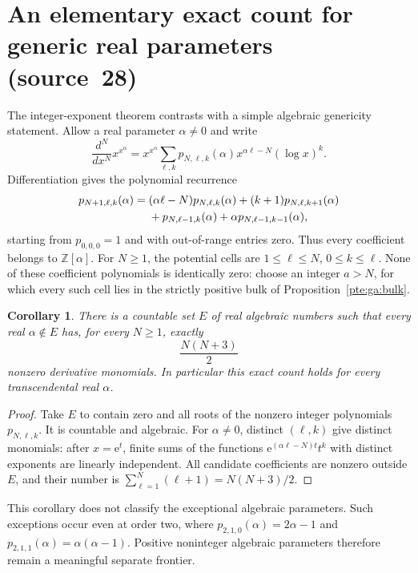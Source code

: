 \documentclass[11pt,a4paper]{article}
\numberwithin{equation}{section}
\newtheorem{corollary}[theorem]{Corollary}
\theoremstyle{definition}
\theoremstyle{plain}
\newcommand{\ee}{\mathrm e}
\newcommand{\src}[1]{\texorpdfstring{\textup{(source~#1)}}{(source #1)}}
\begin{document}
\section{An elementary exact count for generic real parameters \src{28}}\label{pte:sec:ga-generic}
The integer-exponent theorem contrasts with a simple algebraic genericity statement. Allow a real parameter $\alpha\ne0$ and write
\[
 \frac{d^N}{dx^N}x^{x^\alpha}
 =x^{x^\alpha}\sum_{\ell,k}p_{N,\ell,k}(\alpha)
                 x^{\alpha\ell-N}(\log x)^k.
\]
Differentiation gives the polynomial recurrence
\begin{align}\label{pte:ga:parameterrecurrence}
 p_{N+1,\ell,k}(\alpha)={}&(\alpha\ell-N)p_{N,\ell,k}(\alpha)
 +(k+1)p_{N,\ell,k+1}(\alpha)\notag\\
 &+p_{N,\ell-1,k}(\alpha)
 +\alpha p_{N,\ell-1,k-1}(\alpha),
\end{align}
starting from $p_{0,0,0}=1$ and with out-of-range entries zero. Thus every coefficient belongs to $\mathbb Z[\alpha]$. For $N\ge1$, the potential cells are $1\le\ell\le N$, $0\le k\le\ell$. None of these coefficient polynomials is identically zero: choose an integer $a>N$, for which every such cell lies in the strictly positive bulk of Proposition~\ref{pte:ga:bulk}.

\begin{corollary}\label{pte:ga:generic}
There is a countable set $E$ of real algebraic numbers such that every real $\alpha\notin E$ has, for every $N\ge1$, exactly
\[
 \frac{N(N+3)}2
\]
nonzero derivative monomials. In particular this exact count holds for every transcendental real $\alpha$.
\end{corollary}
\begin{proof}
Take $E$ to contain zero and all roots of the nonzero integer polynomials $p_{N,\ell,k}$. It is countable and algebraic. For $\alpha\ne0$, distinct $(\ell,k)$ give distinct monomials: after $x=\ee^t$, finite sums of the functions $\ee^{(\alpha\ell-N)t}t^k$ with distinct exponents are linearly independent. All candidate coefficients are nonzero outside $E$, and their number is $\sum_{\ell=1}^N(\ell+1)=N(N+3)/2$.
\end{proof}
This corollary does not classify the exceptional algebraic parameters. Such exceptions occur even at order two, where $p_{2,1,0}(\alpha)=2\alpha-1$ and $p_{2,1,1}(\alpha)=\alpha(\alpha-1)$. Positive noninteger algebraic parameters therefore remain a meaningful separate frontier.
\end{document}
